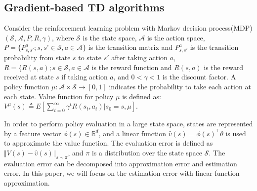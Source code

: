 \documentclass[twoside,11pt]{article}
\numberwithin{equation}{section}
\begin{document}
	\subsection{Gradient-based TD algorithms}
		Consider the reinforcement learning problem with Markov decision process(MDP) $ (\mathcal{S},\mathcal{A},P,R,\gamma) $, where $ \mathcal{S} $ is the state space, $ \mathcal{A} $ is the action space, $ P= \{P_{s,s'}^a; s,s’\in \mathcal{S}, a\in\mathcal{A}\} $ is the transition matrix and $ P_{s,s'}^a $ is the transition probability from state $ s $ to state $ s' $ after taking action $ a $, $ R=\{R(s,a );s\in \mathcal{S},a\in\mathcal{A}$ is the reward function and $R(s,a)$ is the reward received at state $s$ if taking action $a$, and $ 0<\gamma<1 $ is the discount factor. 	
		A policy function $ \mu : \mathcal{A}\times\mathcal{S}\to [0,1]$ indicates the probability to take each action at each state.  Value function for policy $ \mu $ is defined as: $ 	V^{\mu}(s)\triangleq E\left[ \sum_{t=0}^{\infty}\gamma^t R(s_t,a_t)|s_0 = s,\mu  \right] $.
		
		
		In order to perform policy evaluation in a large state space, states are represented by a feature vector $\phi(s)\in\mathbb{R}^d$, and a linear   function  $ \hat{v}(s) = \phi(s)^\top \theta  $
		is used to approximate the value function. The evaluation error is defined as  $ \Vert V(s) - \hat{v}(s) \Vert_{s\sim \pi} $, and $ \pi $ is a distribution over the state space $ \mathcal{S} $. The evaluation error can be decomposed into approximation error and estimation error. In this paper, we will focus on the estimation error with linear function approximation. 
		
\end{document}
